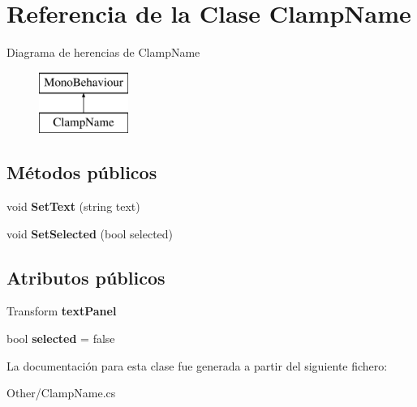 \hypertarget{class_clamp_name}{}\section{Referencia de la Clase Clamp\+Name}
\label{class_clamp_name}
Diagrama de herencias de Clamp\+Name\begin{figure}[H]
\begin{center}
\leavevmode
\includegraphics[height=2.000000cm]{class_clamp_name}
\end{center}
\end{figure}
\subsection*{Métodos públicos}
\begin{DoxyCompactItemize}
\item 
\mbox{\label{class_clamp_name_a8845016c54fa64235db1c72716098f96}} 
void {\bfseries Set\+Text} (string text)
\item 
\mbox{\label{class_clamp_name_ae3850d4ccc21188089e261ab805c036b}} 
void {\bfseries Set\+Selected} (bool selected)
\end{DoxyCompactItemize}
\subsection*{Atributos públicos}
\begin{DoxyCompactItemize}
\item 
\mbox{\label{class_clamp_name_ad49af9dcd383039bcc2759c1c36e98a5}} 
Transform {\bfseries text\+Panel}
\item 
\mbox{\label{class_clamp_name_a2d7befc258d1492eec30282262971192}} 
bool {\bfseries selected} = false
\end{DoxyCompactItemize}


La documentación para esta clase fue generada a partir del siguiente fichero\+:\begin{DoxyCompactItemize}
\item 
Other/Clamp\+Name.\+cs\end{DoxyCompactItemize}
